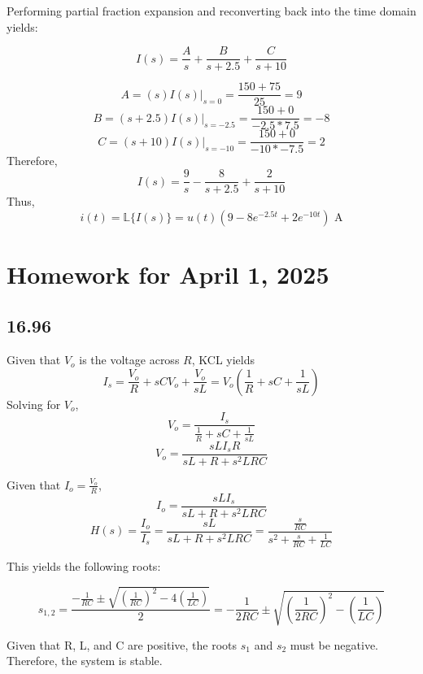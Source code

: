 \documentclass{article}
\begin{document}
\noindent Performing partial fraction expansion and reconverting back into the time domain yields:

$$I(s)=\frac{A}{s} + \frac{B}{s+2.5} + \frac{C}{s+10}$$

$$A=(s)I(s)|_{s=0} = \frac{150 + 75}{25} = 9$$
$$B=(s+2.5)I(s)|_{s=-2.5} = \frac{150 + 0}{-2.5 * 7.5} = -8$$
$$C = (s+10)I(s)|_{s=-10} = \frac{150 + 0}{-10 * -7.5} = 2$$
\noindent Therefore, $$I(s)=\frac9s - \frac{8}{s+2.5} + \frac{2}{s+10}$$
\noindent Thus, $$i(t) = \mathbb{L}\{I(s)\}= u(t) \left( 9 - 8e^{-2.5t} + 2e^{-10t}\right) \text{ A}$$


\section*{Homework for April 1, 2025}

\subsection*{16.96}

Given that $V_o$ is the voltage across $R$, KCL yields
$$I_s=\frac{V_o}{R} + sCV_o + \frac{V_o}{sL}=V_o \left(\frac{1}{R} + sC + \frac{1}{sL}\right)$$
Solving for $V_o$,
$$V_o=\frac{I_s}{\frac{1}{R} + sC + \frac{1}{sL}}$$
$$V_o=\frac{sLI_sR}{sL + R + s^2LRC}$$

Given that $I_o = \frac{V_o}{R}$, 
$$I_o=\frac{sLI_s}{sL + R + s^2LRC}$$
$$H(s) = \frac{I_o}{I_s}=\frac{sL}{sL + R + s^2LRC}=\frac{\frac{s}{RC}}{s^2 + \frac{s}{RC} + \frac{1}{LC}}$$

This yields the following roots:

$$s_{1,2} = \frac{-\frac{1}{RC} \pm \sqrt{\left(\frac{1}{RC}\right)^2 - 4\left(\frac{1}{LC}\right)}}{2}=-\frac{1}{2RC} \pm \sqrt{\left(\frac{1}{2RC}\right)^2 - \left(\frac{1}{LC}\right)}$$

Given that R, L, and C are positive, the roots $s_1$ and $s_2$ must be negative.
Therefore, the system is stable.
\end{document}
